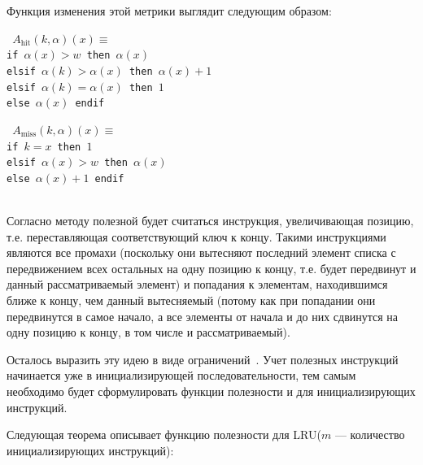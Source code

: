 \documentclass[14pt]{extreport}
\newcommand{\LRU}{\textsf{LRU}\xspace}
\begin{document}
Функция изменения этой метрики выглядит следующим образом:\\

\parbox{0.5\textwidth}{ \tt
$A_{\mbox{hit}}(k, \alpha)(x) \equiv$\\
if $\alpha(x) > w$ then $\alpha(x)$\\
elsif $\alpha(k) > \alpha(x)$ then $\alpha(x)+1$\\
elsif $\alpha(k) = \alpha(x)$ then $1$\\
else $\alpha(x)$ endif%
}\parbox{0.5\textwidth}{\tt
$A_{\mbox{miss}}(k, \alpha)(x) \equiv$\\
if $k = x$ then $1$\\
elsif $\alpha(x) > w$ then $\alpha(x)$\\
else $\alpha(x) + 1$ endif}\\

Согласно методу полезной будет считаться инструкция, увеличивающая позицию, т.е. переставляющая соответствующий ключ к концу. Такими инструкциями являются все промахи (поскольку они
вытесняют последний элемент списка с передвижением всех остальных на одну
позицию к концу, т.е. будет передвинут и данный рассматриваемый элемент) и попадания к элементам, находившимся ближе к концу, чем данный вытесняемый (потому как при попадании они
передвинутся в самое начало, а все элементы от начала и до них сдвинутся на одну позицию к концу, в том числе и рассматриваемый).

Осталось выразить эту идею в виде ограничений~\cite{my_ewdts_2009}.
Учет полезных инструкций начинается уже в инициализирующей последовательности, тем самым необходимо будет сформулировать функции полезности и для инициализирующих инструкций.

Следующая теорема описывает функцию полезности для \LRU ($m$ --- количество инициализирующих инструкций):
\end{document}
